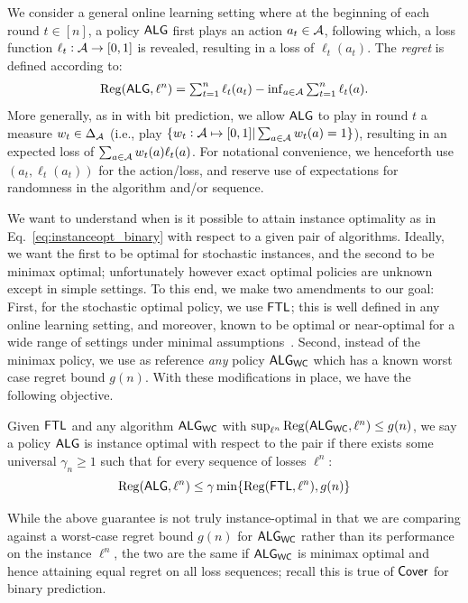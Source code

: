 We consider a general online learning setting where at the beginning of each round $t \in [n]$, a policy $\mathsf{ALG}$ first plays an action $a_t \in \mathcal{A}$, following which, a loss function $\ell_t:\mathcal{A}\to [0,1]$ is revealed, resulting in a loss of $\ell_t(a_t)$. The \emph{regret} is defined according to:
\begin{align}
\label{eq:RegDefnGeneral}
    \mathrm{Reg}(\mathsf{ALG},\ell^n) = \textstyle\sum_{t=1}^n \ell_t(a_t) - \inf_{a \in \mathcal{A}} \textstyle\sum_{t=1}^n \ell_t(a).
\end{align} 
More generally, as in with bit prediction, we allow $\mathsf{ALG}$ to play in round $t$ a measure $w_t\in\Delta_{\mathcal{A}}$ (i.e., play $\{w_t:\mathcal{A}\mapsto[0,1]|\sum_{a\in\mathcal{A}}w_t(a)=1\}$), resulting in an expected loss of $\sum_{a\in\mathcal{A}}w_t(a)\ell_t(a)$. For notational convenience, we henceforth use $(a_t,\ell_t(a_t))$ for the action/loss, and reserve use of expectations for randomness in the algorithm and/or sequence.

We want to understand when is it possible to attain instance optimality as in Eq.~\eqref{eq:instanceopt_binary} with respect to a given pair of algorithms. Ideally, we want the first to be optimal for stochastic instances, and the second to be minimax optimal; unfortunately however exact optimal policies are unknown except in simple settings. To this end, we make two amendments to our goal: First, for the stochastic optimal policy, we use $\mathsf{FTL}$; this is well defined in any online learning setting, and moreover, known to be optimal or near-optimal for a wide range of settings under minimal assumptions~\citep{kotlowski2018minimaxity}. Second, instead of the minimax policy, we use as reference \emph{any} policy $\mathsf{ALG}_{\mathsf{WC}}$ which has a known worst case regret bound $g(n)$. With these modifications in place, we have the following objective.

\begin{definition} \label{def:instanceopt_wc}
Given $\mathsf{FTL}$ and any algorithm $\mathsf{ALG}_{\mathsf{WC}}$ with $\sup_{\ell^n} \mathrm{Reg}(\mathsf{ALG}_{\mathsf{WC}}, \ell^n) \le g(n)$, we say a policy $\mathsf{ALG}$ is instance optimal with respect to the pair if there exists some universal $\gamma_n \geq 1$ such that for every sequence of losses $\ell^n$:
\begin{equation*}\label{eq:instanceopt_wc}
\small \mathrm{Reg}(\mathsf{ALG},\ell^n)\leq \gamma \min\{\mathrm{Reg}(\mathsf{FTL},\ell^n),g(n)\}
\end{equation*}
\end{definition}
While the above guarantee is not truly instance-optimal in that we are comparing against a worst-case regret bound $g(n)$ for $\mathsf{ALG}_{\mathsf{WC}}$ rather than its performance on the instance $\ell^n$, the two are the same if $\mathsf{ALG}_{\mathsf{WC}}$ is minimax optimal and hence attaining equal regret on all loss sequences; recall this is true of $\mathsf{Cover}$  for binary prediction.

